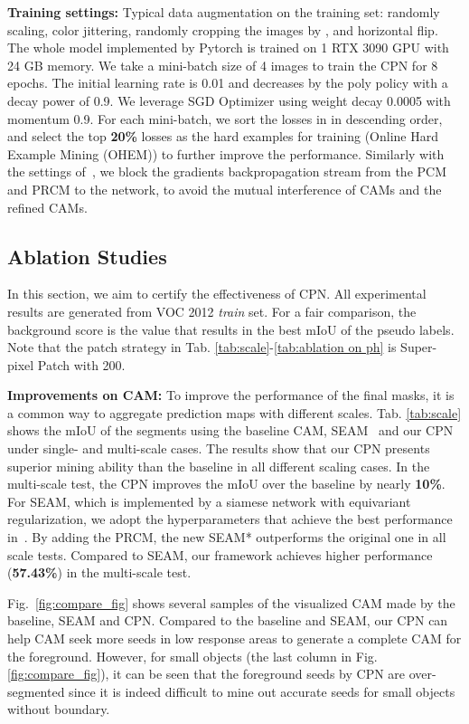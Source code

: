 \documentclass[10pt,twocolumn,letterpaper]{article}
\begin{document}
\noindent\textbf{Training settings:}\; Typical data augmentation on the training set: randomly scaling, color jittering, randomly cropping the images by , and horizontal flip. The whole model implemented by Pytorch is trained on 1 RTX 3090 GPU with 24 GB memory. We take a mini-batch size of 4 images to train the CPN for 8 epochs. The initial learning rate is 0.01 and decreases by the poly policy with a decay power of  0.9. We leverage SGD Optimizer using weight decay 0.0005 with momentum 0.9. For each mini-batch, we sort the losses in  in descending order, and select the top {\textbf{20\%}} losses as the hard examples for training (Online Hard Example Mining (OHEM)) to further improve the performance. Similarly with the settings of~\cite{seam}, we block the gradients backpropagation stream from the PCM and PRCM to the network, to avoid the mutual interference of CAMs and the refined CAMs.
\subsection{Ablation Studies}
In this section, we aim to certify the effectiveness of CPN. All experimental results are generated from VOC 2012 \textit{train} set. For a fair comparison, the background score  is the value that results in the best mIoU of the pseudo labels. Note that the patch strategy in Tab. \ref{tab:scale}-\ref{tab:ablation on ph} is Super-pixel Patch with 200.


\noindent\textbf{Improvements on CAM:}\; To improve the performance of the final masks, it is a common way to aggregate prediction maps with different scales. Tab. \ref{tab:scale} shows the mIoU of the segments using the baseline CAM, SEAM~\cite{seam} and our CPN under single- and multi-scale cases. The results show that our CPN presents superior mining ability than the baseline in all different scaling cases. In the multi-scale test, the CPN improves the mIoU over the baseline by nearly \textbf{10\%}. For SEAM, which is implemented by a siamese network with equivariant regularization, we adopt the hyperparameters that achieve the best performance in~\cite{seam}. By adding the PRCM, the new SEAM* outperforms the original one in all scale tests. Compared to SEAM, our framework achieves higher performance (\textbf{57.43\%}) in the multi-scale test.

Fig.~\ref{fig:compare_fig} shows several samples of the visualized CAM made by the baseline, SEAM and CPN. Compared to the baseline and SEAM, our CPN can help CAM seek more seeds in low response areas to generate a complete CAM for the foreground.  However, for small objects (the last column in Fig. \ref{fig:compare_fig}), it can be seen that the foreground seeds by CPN are over-segmented since it is indeed difficult to mine out accurate seeds for small objects without boundary.
\end{document}
